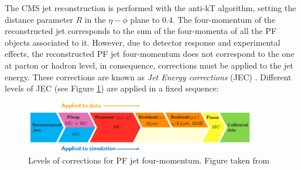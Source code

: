 \noindent The CMS jet reconstruction is performed with the anti-kT algorithm, setting 
the distance parameter $R$ in the $\eta-\phi$ plane to $0.4$. The four-momentum of the 
reconstructed jet corresponds to the sum of the four-momenta of all 
the PF objects associated to it. However, 
due to detector response and experimental effects, the 
reconstructed PF jet four-momentum does not correspond to the one
at parton or hadron level, in consequence, corrections must be applied
to the jet energy. These corrections are known as 
\textit{Jet Energy corrections} (JEC) \cite{JECpileup,JESandJER}. Different levels of JEC 
(see Figure \ref{fig:JEC_levels}) are applied in a fixed sequence: \\

\begin{figure}[ht]%
  \begin{center}
    \includegraphics[width=0.9\textwidth]{figuras/Chapter3/JEC_levels.png}
    \caption{Levels of corrections for PF jet four-momentum. Figure taken from \cite{JESandJER}}
    \label{fig:JEC_levels}
  \end{center}
\end{figure}
